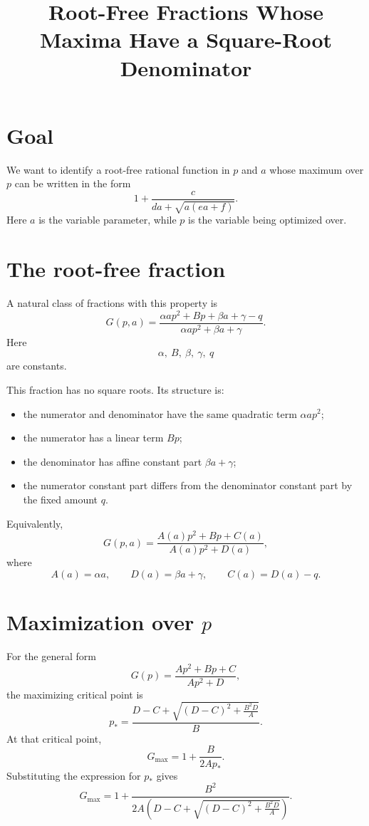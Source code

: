 \documentclass[11pt]{article}
\title{Root-Free Fractions Whose Maxima Have a Square-Root Denominator}
\author{}
\date{}
\begin{document}
\maketitle

\section{Goal}

We want to identify a root-free rational function in \(p\) and \(a\) whose maximum over \(p\) can be written in the form
\[
1+\frac{c}{da+\sqrt{a(ea+f)}}.
\]
Here \(a\) is the variable parameter, while \(p\) is the variable being optimized over.

\section{The root-free fraction}

A natural class of fractions with this property is
\[
\boxed{
G(p,a)
=
\frac{\alpha a p^2+Bp+\beta a+\gamma-q}
{\alpha a p^2+\beta a+\gamma}.
}
\]
Here
\[
\alpha,\ B,\ \beta,\ \gamma,\ q
\]
are constants.

This fraction has no square roots. Its structure is:
\begin{itemize}
    \item the numerator and denominator have the same quadratic term \(\alpha a p^2\);
    \item the numerator has a linear term \(Bp\);
    \item the denominator has affine constant part \(\beta a+\gamma\);
    \item the numerator constant part differs from the denominator constant part by the fixed amount \(q\).
\end{itemize}

Equivalently,
\[
G(p,a)
=
\frac{A(a)p^2+Bp+C(a)}
{A(a)p^2+D(a)},
\]
where
\[
A(a)=\alpha a,
\qquad
D(a)=\beta a+\gamma,
\qquad
C(a)=D(a)-q.
\]

\section{Maximization over \(p\)}

For the general form
\[
G(p)
=
\frac{Ap^2+Bp+C}{Ap^2+D},
\]
the maximizing critical point is
\[
p_\ast
=
\frac{D-C+\sqrt{(D-C)^2+\frac{B^2D}{A}}}{B}.
\]
At that critical point,
\[
G_{\max}
=
1+\frac{B}{2Ap_\ast}.
\]
Substituting the expression for \(p_\ast\) gives
\[
G_{\max}
=
1+
\frac{B^2}
{2A\left(D-C+\sqrt{(D-C)^2+\frac{B^2D}{A}}\right)}.
\]
\end{document}
